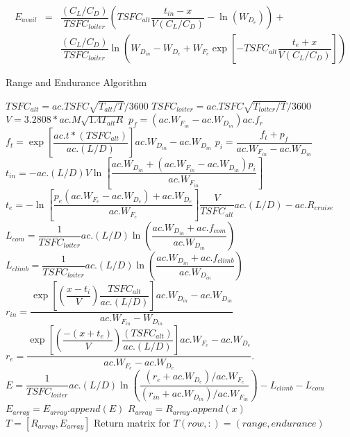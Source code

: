 \begin{eqnarray}
\label{eq:EnduranceWithRange}
    E_{avail} & = &\dfrac{(C_L/C_D)}{TSFC_{loiter}}\left(TSFC_{alt}\dfrac{t_{in}-x}{V(C_L/C_D)}-\ln\left(W_{D_e}\right)\right) + \nonumber \\
    & &\dfrac{(C_L/C_D)}{TSFC_{loiter}}\ln\left(W_{D_{in}}-W_{D_e}+W_{F_e}\exp\left[-TSFC_{alt}\dfrac{t_e+x}{V(C_L/C_D)}\right]\right)
\end{eqnarray}
\begin{algorithm}[H]
\caption{Range and Endurance Algorithm}
\label{Alg:R&E}
\begin{algorithmic}
\State $TSFC_{alt} = ac.TSFC\sqrt{T_{alt}/T}/3600$
\State $TSFC_{loiter} = ac.TSFC\sqrt{T_{loiter}/T}/3600$
\State $V = 3.2808*ac.M\sqrt{1.4T_{alt}R}$
\State $p_f = (ac.W_{F_{in}}-ac.W_{D_{in}})ac.f_r$
\State $f_t = \exp\left[\dfrac{ac.t*(TSFC_{alt})}{ac.(L/D)}\right]ac.W_{D_{in}}-ac.W_{D_{in}}$
\State $p_i = \dfrac{f_t + p_f}{ac.W_{F_{in}}-ac.W_{D_{in}}}$
\State $t_{in} = -ac.(L/D)V\ln\left[\dfrac{ac.W_{D_{in}}+(ac.W_{F_{in}}-ac.W_{D_{in}})p_i}{ac.W_{F_{in}}}\right]$
\State $t_e = -\ln\left[\dfrac{p_e(ac.W_{F_e}-ac.W_{D_e})+ac.W_{D_e}}{ac.W_{F_e}}\right]\dfrac{V}{TSFC_{alt}}ac.(L/D)-ac.R_{cruise}$
\State $L_{com} = \dfrac{1}{TSFC_{loiter}}ac.(L/D)\ln\left(\dfrac{ac.W_{D_{in}}+ac.f_{com}}{ac.W_{D_{in}}}\right)$
\State $L_{climb} = \dfrac{1}{TSFC_{loiter}}ac.(L/D)\ln\left(\dfrac{ac.W_{D_{in}}+ac.f_{climb}}{ac.W_{D_{in}}}\right)$
    \State $r_{in}=\dfrac{\exp\left[\left(\dfrac{x-t_i}{V}\right)\dfrac{TSFC_{alt}}{ac.(L/D)}\right]ac.W_{D_{in}}-ac.W_{D_{in}}}{ac.W_{F_{in}} - W_{D_{in}}}$
    \State $r_e = \dfrac{\exp\left[\left(\dfrac{-(x+t_e)}{V}\right)\dfrac{(TSFC_{alt})}{ac.(L/D)}\right]ac.W_{F_e}-ac.W_{D_e}}{ac.W_{F_e} - ac.W_{D_e}}.$
    \State $E = \dfrac{1}{TSFC_{loiter}}ac.(L/D)\ln\left(\dfrac{(r_e+ ac.W_{D_e})/ac.W_{F_e}}{(r_{in}+ac.W_{D_{in}})/ac.W_{F_{in}}}\right) - L_{climb}-L_{com}$
    \State $E_{array} = E_{array}.append(E)$
    \State $R_{array} = R_{array}.append(x)$
\EndFor\\
\Return $T = [R_{array}, E_{array}]$ \Comment Return matrix for $T(row,:) = (range,endurance)$
\end{algorithmic}
\end{algorithm}
